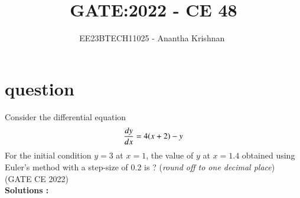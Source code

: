 \documentclass[journal,12pt,onecolumn]{IEEEtran}
\theoremstyle{remark}
\begin{document}

\vspace{3cm}

\title{GATE:2022 - CE 48 }
\author{EE23BTECH11025 - Anantha Krishnan $^{}$%
}
\maketitle
\bigskip



\section{question}

Consider the differential equation
\begin{align}
    \dv{y}{x} = 4(x+2) - y \notag
\end{align}
For the initial condition $y = 3$ at $x = 1$, the value of $y$ at $x = 1.4$ obtained using Euler's method with a step-size of 0.2 is ? (\textit{round off to one decimal place})
\hfill{(GATE CE 2022)}\\
 



\textbf{Solutions :}
    
\end{document}
